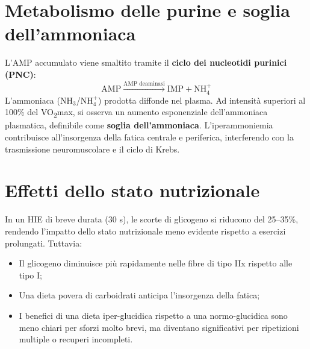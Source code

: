\documentclass[12pt,a4paper]{report}
\begin{document}
\section{Metabolismo delle purine e soglia dell'ammoniaca}
L'AMP accumulato viene smaltito tramite il \textbf{ciclo dei nucleotidi purinici (PNC)}:
\[
\mathrm{AMP \xrightarrow{\text{AMP deaminasi}} IMP + NH_4^+}
\]
L'ammoniaca (\(\mathrm{NH_3}\)/\(\mathrm{NH_4^+}\)) prodotta diffonde nel plasma. Ad intensità superiori al 100\% del VO\textsubscript{2}max, si osserva un aumento esponenziale dell'ammoniaca plasmatica, definibile come \textbf{soglia dell'ammoniaca}. L'iperammoniemia contribuisce all'insorgenza della fatica centrale e periferica, interferendo con la trasmissione neuromuscolare e il ciclo di Krebs.

\section{Effetti dello stato nutrizionale}
In un HIE di breve durata (30 s), le scorte di glicogeno si riducono del 25--35\%, rendendo l'impatto dello stato nutrizionale meno evidente rispetto a esercizi prolungati. Tuttavia:
\begin{itemize}
\item Il glicogeno diminuisce più rapidamente nelle fibre di tipo IIx rispetto alle tipo I;
\item Una dieta povera di carboidrati anticipa l'insorgenza della fatica;
\item I benefici di una dieta iper-glucidica rispetto a una normo-glucidica sono meno chiari per sforzi molto brevi, ma diventano significativi per ripetizioni multiple o recuperi incompleti.
\end{itemize}
\end{document}
